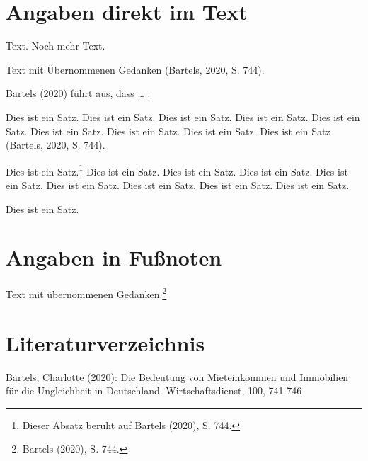 \documentclass[
]{article}
\author{}
\date{\vspace{-2.5em}}
\begin{document}
\hypertarget{angaben-direkt-im-text}{%
\section{Angaben direkt im Text}\label{angaben-direkt-im-text}}

Text. Noch mehr Text.

Text mit Übernommenen Gedanken (Bartels, 2020, S. 744).

Bartels (2020) führt aus, dass \ldots{} .

Dies ist ein Satz. Dies ist ein Satz. Dies ist ein Satz. Dies ist ein
Satz. Dies ist ein Satz. Dies ist ein Satz. Dies ist ein Satz. Dies ist
ein Satz. Dies ist ein Satz (Bartels, 2020, S. 744).

Dies ist ein Satz.\footnote{Dieser Absatz beruht auf Bartels (2020), S.
  744.} Dies ist ein Satz. Dies ist ein Satz. Dies ist ein Satz. Dies
ist ein Satz. Dies ist ein Satz. Dies ist ein Satz. Dies ist ein Satz.
Dies ist ein Satz.

Dies ist ein Satz.

\hypertarget{angaben-in-fuuxdfnoten}{%
\section{Angaben in Fußnoten}\label{angaben-in-fuuxdfnoten}}

Text mit übernommenen Gedanken.\footnote{Bartels (2020), S. 744.}

\hypertarget{literaturverzeichnis}{%
\section*{Literaturverzeichnis}\label{literaturverzeichnis}}

Bartels, Charlotte (2020): Die Bedeutung von Mieteinkommen und
Immobilien für die Ungleichheit in Deutschland. Wirtschaftsdienst, 100,
741-746
\end{document}
